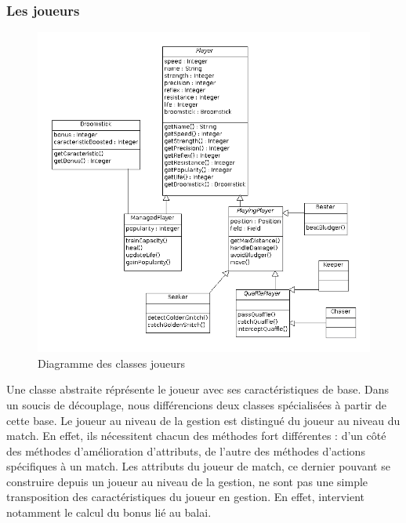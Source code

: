 \documentclass[a4paper,titlepage]{scrreprt}
\begin{document}
\begin{itemize}
  \subsubsection{Les joueurs}
    \begin{figure}[H]
    \center
    \includegraphics[scale=0.4]{uml/class/DiagrammedeclassesJoueurs.png}
    \caption{Diagramme des classes joueurs}
  \end{figure}	
    Une classe abstraite réprésente le \gls{joueur} avec ses caractéristiques de base.
    Dans un soucis de découplage, nous différencions deux classes spécialisées à partir de cette base.
    Le joueur au niveau de la gestion est distingué du joueur au niveau du match.
    En effet, ils nécessitent chacun des méthodes fort différentes :
    d'un côté des méthodes d'amélioration d'attributs,
    de l'autre des méthodes d'actions spécifiques à un match.
    Les attributs du joueur de match, ce dernier pouvant se construire depuis un joueur
    au niveau de la gestion, ne sont pas une simple transposition des caractéristiques
    du joueur en gestion. En effet, intervient notamment le calcul du bonus lié au balai.

\end{itemize}
\end{document}
